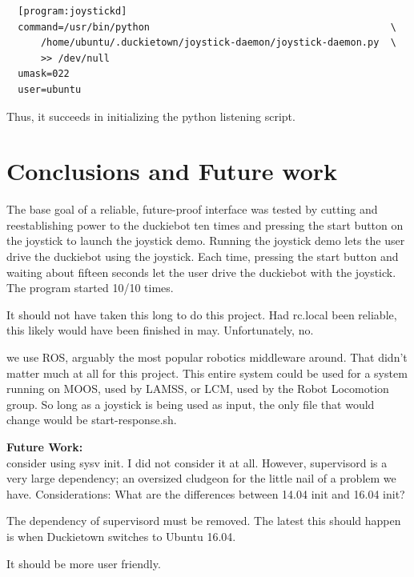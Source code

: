 \documentclass[titlepage]{article}
\begin{document}
\begin{lstlisting}
  [program:joystickd]
  command=/usr/bin/python                                          \
      /home/ubuntu/.duckietown/joystick-daemon/joystick-daemon.py  \
      >> /dev/null
  umask=022
  user=ubuntu
\end{lstlisting}

Thus, it succeeds in initializing the python listening script. 


\section{Conclusions and Future work}
The base goal of a reliable, future-proof interface was tested by cutting and reestablishing power to the duckiebot ten times and pressing the start button on the joystick to launch the joystick demo. Running the joystick demo lets the user drive the duckiebot using the joystick. Each time, pressing the start button and waiting about fifteen seconds let the user drive the duckiebot with the joystick. The program started 10/10 times. 

It should not have taken this long to do this project. Had rc.local been reliable, this likely would have been finished in may. Unfortunately, no. 

we use ROS, arguably the most popular robotics middleware around. That didn't matter much at all for this project. This entire system could be used for a system running on MOOS, used by LAMSS, or LCM, used by the Robot Locomotion group. So long as a joystick is being used as input, the only file that would change would be start-response.sh.

\textbf{Future Work:} \\
consider using sysv init. I did not consider it at all. However, supervisord is a very large dependency; an oversized cludgeon for the little nail of a problem we have. Considerations: What are the differences between 14.04 init and 16.04 init? 

The dependency of supervisord must be removed. The latest this should happen is when Duckietown switches to Ubuntu 16.04. 

It should be more user friendly.  
\end{document}
